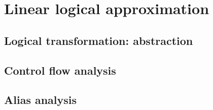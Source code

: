\chapter{Linear logical approximation}
\label{chapter-approx}

\section{Logical transformation: abstraction}
\label{sec:abstraction}

\section{Control flow analysis}

\section{Alias analysis}
